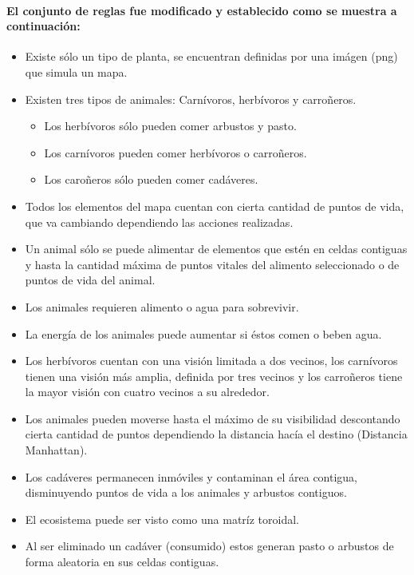   \paragraph{El conjunto de reglas fue modificado y establecido como se muestra a continuación:}
    \begin{itemize}
      \item{Existe sólo un tipo de planta, se encuentran definidas por una imágen (png) que simula un mapa.}
      \item{Existen tres tipos de animales: Carnívoros, herbívoros y carroñeros.}
      \begin{itemize}
        \item{Los herbívoros sólo pueden comer arbustos y pasto.}
        \item{Los carnívoros pueden comer herbívoros o carroñeros.}
        \item{Los caroñeros sólo pueden comer cadáveres.}
      \end{itemize}
      \item{Todos los elementos del mapa cuentan con cierta cantidad de puntos de vida, que va cambiando dependiendo las acciones realizadas.}
      \item{Un animal sólo se puede alimentar de elementos que estén en celdas contiguas y hasta la cantidad máxima de puntos vitales del alimento seleccionado o de puntos de vida del animal.}
      \item{Los animales requieren alimento o agua para sobrevivir.}
      \item{La energía de los animales puede aumentar si éstos comen o beben agua.}
      \item{Los herbívoros cuentan con una visión limitada a dos vecinos, los carnívoros tienen una visión más amplia, definida por tres vecinos y los carroñeros tiene la mayor visión con cuatro vecinos a su alrededor.}
      \item{Los animales pueden moverse hasta el máximo de su visibilidad descontando cierta cantidad de puntos dependiendo la distancia hacía el destino (Distancia Manhattan).}
      \item{Los cadáveres permanecen inmóviles y contaminan el área contigua, disminuyendo puntos de vida a los animales y arbustos contiguos.}
      \item{El ecosistema puede ser visto como una matríz toroidal.}
      \item{Al ser eliminado un cadáver (consumido) estos generan pasto o arbustos de forma aleatoria en sus celdas contiguas.}

\end{itemize}
